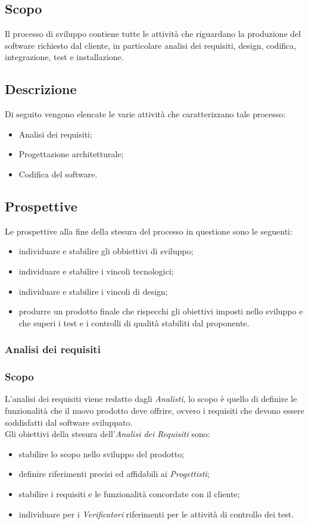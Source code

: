 \subsection{Scopo}\label{2.2.1}
Il processo di sviluppo contiene tutte le attività che riguardano la produzione del software richiesto dal cliente, in particolare analisi dei requisiti, design, codifica, integrazione, test e installazione.
\subsection{Descrizione}\label{2.2.2}
Di seguito vengono elencate le varie attività che caratterizzano tale processo:
\begin{itemize}
	\item Analisi dei requisiti;
	\item Progettazione architetturale;
	\item Codifica del software.
\end{itemize}
\subsection{Prospettive}\label{2.2.3}
Le prospettive alla fine della stesura del processo in questione sono le seguenti:
\begin{itemize}
	\item individuare e stabilire gli obbiettivi di sviluppo;
	\item individuare e stabilire i vincoli tecnologici;
	\item individuare e stabilire i vincoli di design;
	\item produrre un prodotto finale che rispecchi gli obiettivi imposti nello sviluppo e che superi i test e i controlli di qualità stabiliti dal proponente.
\end{itemize}
\subsubsection{Analisi dei requisiti}\label{2.2.3.1}
\subsubsection{Scopo}\label{2.2.3.2}
L'analisi dei requisiti viene redatto dagli \textit{Analisti}, lo scopo è quello di definire le funzionalità che il nuovo prodotto deve offrire, ovvero i requisiti che devono essere soddisfatti dal software sviluppato.\\
Gli obiettivi della stesura dell'\textit{Analisi dei Requisiti} sono:
\begin{itemize}
	\item stabilire lo scopo nello sviluppo del prodotto;
	\item definire riferimenti precisi ed affidabili ai \textit{Progettisti};
	\item stabilire i requisiti e le funzionalità concordate con il cliente;
	\item individuare per i \textit{Verificatori} riferimenti per le attività di controllo dei test.
\end{itemize}
